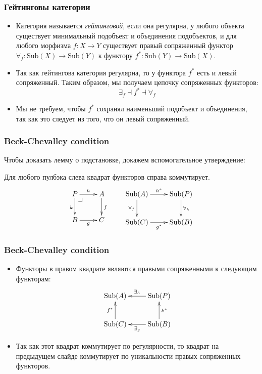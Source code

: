 \documentclass{beamer}
\makeatletter
\theoremstyle{definition}
\newcommand{\fs}[1]{\mathrm{#1}}
\newcommand{\Sub}{\fs{Sub}}
\newcommand{\pb}[1][dr]{\save*!/#1-1.2pc/#1:(-1,1)@^{|-}\restore}
\makeatother
\begin{document}
\begin{frame}
\frametitle{Гейтинговы категории}
\begin{itemize}
\item Категория называется \emph{гейтинговой}, если она регулярна, у любого объекта существует минимальный подобъект и объединения подобъектов,
и для любого морфизма $f : X \to Y$ существует правый сопряженный функтор $\forall_f : \Sub(X) \to \Sub(Y)$ к функтору $f^* : \Sub(Y) \to \Sub(X)$.
\item Так как гейтингова категория регулярна, то у функтора $f^*$ есть и левый сопряженный. Таким образом, мы получаем цепочку сопряженных функторов:
\[ \exists_f \dashv f^* \dashv \forall_f \]
\item Мы не требуем, чтобы $f^*$ сохранял наименьший подобъект и объединения, так как это следует из того, что он левый сопряженный.
\end{itemize}
\end{frame}

\begin{frame}
\frametitle{Beck-Chevalley condition}
Чтобы доказать лемму о подстановке, докажем вспомогательное утверждение:
\begin{prop}
Для любого пулбэка слева квадрат функторов справа коммутирует.
\[ \xymatrix{ P \ar[r]^h \ar[d]_k \pb & A \ar[d]^f \\
              B \ar[r]_g              & C
            } \qquad
   \xymatrix{ \Sub(A) \ar[r]^{h^*} \ar[d]_{\forall_f} & \Sub(P) \ar[d]^{\forall_k} \\
              \Sub(C) \ar[r]_{g^*}                    & \Sub(B)
            } \]
\end{prop}
\end{frame}

\begin{frame}
\frametitle{Beck-Chevalley condition}
\begin{itemize}
\item Функторы в правом квадрате являются правыми сопряженными к следующим функторам:
\[ \xymatrix{ \Sub(A)              & \Sub(P) \ar[l]_{\exists_h} \\
              \Sub(C) \ar[u]^{f^*} & \Sub(B) \ar[l]^{\exists_g} \ar[u]_{k^*} 
            } \]
\item Так как этот квадрат коммутирует по регулярности, то квадрат на предыдущем слайде коммутирует по уникальности правых сопряженных функторов.
\end{itemize}
\end{frame}
\end{document}
